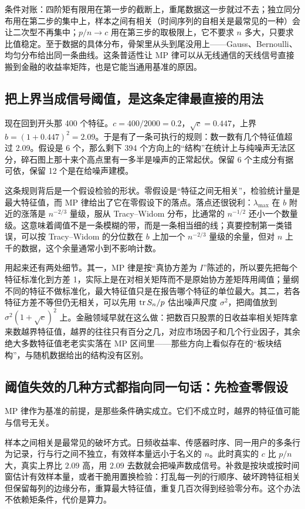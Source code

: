条件对账：四阶矩有限用在第一步的截断上，重尾数据这一步就过不去；独立同分布用在第二步的集中上，样本之间有相关（时间序列的自相关是最常见的一种）会让二次型不再集中；\(p/n\to c\) 用在第三步的取极限上，它不要求 \(n\) 多大，只要求比值稳定。至于数据的具体分布，骨架里从头到尾没用上——Gauss、Bernoulli、均匀分布给出同一条曲线。这条普适性让 MP 律可以从无线通信的天线信号直接搬到金融的收益率矩阵，也是它能当通用基准的原因。

\subsection{把上界当成信号阈值，是这条定律最直接的用法}

现在回到开头那 400 个特征。\(c=400/2000=0.2\)，\(\sqrt c=0.447\)，上界 \(b=(1+0.447)^2=2.09\)。于是有了一条可执行的规则：数一数有几个特征值超过 2.09。假设是 6 个，那么剩下 394 个方向上的``结构''在统计上与纯噪声无法区分，碎石图上那十来个高点里有一多半是噪声的正常起伏。保留 6 个主成分有据可依，保留 12 个是在给噪声建模。

这条规则背后是一个假设检验的形状。零假设是``特征之间无相关''，检验统计量是最大特征值，而 MP 律给出了它在零假设下的落点。落点还很锐利：\(\lambda_{\max}\) 在 \(b\) 附近的涨落是 \(n^{-2/3}\) 量级，服从 Tracy--Widom 分布，比通常的 \(n^{-1/2}\) 还小一个数量级。这意味着阈值不是一条模糊的带，而是一条相当细的线；真要控制第一类错误，可以按 Tracy--Widom 的分位数在 \(b\) 上加一个 \(n^{-2/3}\) 量级的余量，但对 \(n\) 上千的数据，这个余量通常小到不影响计数。

用起来还有两处细节。其一，MP 律是按``真协方差为 \(I\)''陈述的，所以要先把每个特征标准化到方差 1，实际上是在对相关矩阵而不是原始协方差矩阵用阈值；量纲不同的特征不做标准化，最大特征值只是在报告哪个特征的单位最大。其二，若各特征方差不等但仍无相关，可以先用 \(\operatorname{tr} S_n/p\) 估出噪声尺度 \(\sigma^2\)，把阈值放到 \(\sigma^2(1+\sqrt c)^2\) 上。金融领域早就在这么做：把数百只股票的日收益率相关矩阵拿来数越界特征值，越界的往往只有百分之几，对应市场因子和几个行业因子，其余绝大多数特征值老老实实落在 MP 区间里——那些方向上看似存在的``板块结构''，与随机数据给出的结构没有区别。

\subsection{阈值失效的几种方式都指向同一句话：先检查零假设}

MP 律作为基准的前提，是那些条件确实成立。它们不成立时，越界的特征值可能与信号无关。

样本之间相关是最常见的破坏方式。日频收益率、传感器时序、同一用户的多条行为记录，行与行之间不独立，有效样本量远小于名义的 \(n\)。此时真实的 \(c\) 比 \(p/n\) 大，真实上界比 \(2.09\) 高，用 \(2.09\) 去数就会把噪声数成信号。补救是按块或按时间窗估计有效样本量，或者干脆用置换检验：打乱每一列的行顺序、破坏跨特征相关但保留每列的边缘分布，重算最大特征值，重复几百次得到经验零分布。这个办法不依赖矩条件，代价是算力。

